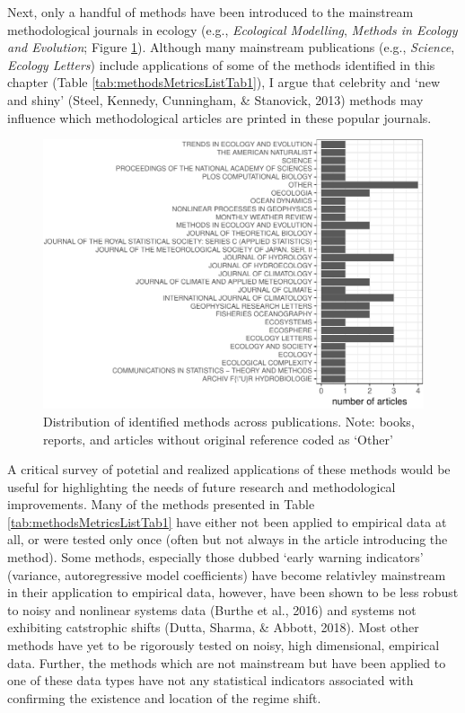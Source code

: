 \documentclass[12pt,twoside,openany]{reedthesis}
\begin{document}
Next, only a handful of methods have been introduced to the mainstream
methodological journals in ecology (e.g., \emph{Ecological Modelling},
\emph{Methods in Ecology and Evolution}; Figure \ref{fig:jrnlDistFig}).
Although many mainstream publications (e.g., \emph{Science},
\emph{Ecology Letters}) include applications of some of the methods
identified in this chapter (Table \ref{tab:methodsMetricsListTab1}), I
argue that celebrity and `new and shiny' (Steel, Kennedy, Cunningham, \&
Stanovick, 2013) methods may influence which methodological articles are
printed in these popular journals.
\begin{figure}
\centering
\includegraphics{_myDissertation_files/figure-latex/jrnlDistFig-1.pdf}
\caption{\label{fig:jrnlDistFig}Distribution of identified methods across
publications. Note: books, reports, and articles without original
reference coded as `Other'}
\end{figure}
A critical survey of potetial and realized applications of these methods
would be useful for highlighting the needs of future research and
methodological improvements. Many of the methods presented in Table
\ref{tab:methodsMetricsListTab1} have either not been applied to
empirical data at all, or were tested only once (often but not always in
the article introducing the method). Some methods, especially those
dubbed `early warning indicators' (variance, autoregressive model
coefficients) have become relativley mainstream in their application to
empirical data, however, have been shown to be less robust to noisy and
nonlinear systems data (Burthe et al., 2016) and systems not exhibiting
catstrophic shifts (Dutta, Sharma, \& Abbott, 2018). Most other methods
have yet to be rigorously tested on noisy, high dimensional, empirical
data. Further, the methods which are not mainstream but have been
applied to one of these data types have not any statistical indicators
associated with confirming the existence and location of the regime
shift.
\end{document}

